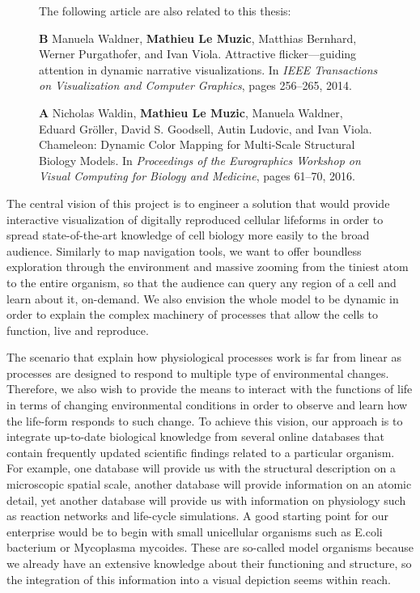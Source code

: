 \begin{figure}
{		The following article are also related to this thesis:	
		\begin{list}{}{}			
			\item[\textbf{B}]Manuela Waldner, \textbf{Mathieu Le Muzic}, Matthias Bernhard, Werner Purgathofer, and Ivan Viola. Attractive flicker—guiding attention in dynamic
			narrative visualizations. In \textit{IEEE Transactions on Visualization and Computer Graphics}, pages 256–265, 2014.	
			
			\item[\textbf{A}]Nicholas Waldin, \textbf{Mathieu Le Muzic}, Manuela Waldner, Eduard Gröller, David S. Goodsell, Autin Ludovic, and Ivan Viola. Chameleon: Dynamic Color Mapping for Multi-Scale Structural Biology Models. In \textit{Proceedings of the Eurographics Workshop on Visual Computing for Biology and Medicine}, pages 61–70, 2016.						
		\end{list}		
	}	
	\label{master-diagram}	
\end{figure}

The central vision of this project is to engineer a solution that would provide interactive visualization of digitally reproduced cellular lifeforms in order to spread state-of-the-art knowledge of cell biology more easily to the broad audience.
Similarly to map navigation tools, we want to offer boundless exploration through the environment and massive zooming from the tiniest atom to the entire organism, so that the audience can query any region of a cell and learn about it, on-demand.
We also envision the whole model to be dynamic in order to explain the complex machinery of processes that allow the cells to function, live and reproduce.

The scenario that explain how physiological processes work is far from linear as processes are designed to respond to multiple type of environmental changes.
Therefore, we also wish to provide the means to interact with the functions of life in terms of changing environmental conditions in order to observe and learn how the life-form responds to such change. 
To achieve this vision, our approach is to integrate up-to-date biological knowledge from several online databases that contain frequently updated scientific findings related to a particular organism. 
For example, one database will provide us with the structural description on a microscopic spatial scale, another database will provide information on an atomic detail, yet another database will provide us with information on physiology such as reaction networks and life-cycle simulations.
A good starting point for our enterprise would be to begin with small unicellular organisms such as E.coli bacterium or Mycoplasma mycoides.
These are so-called model organisms because we already have an extensive knowledge about their functioning and structure, so the integration of this information into a visual depiction seems within reach. 

